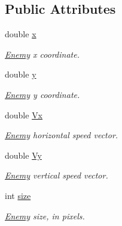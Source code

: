 \subsection*{Public Attributes}
\begin{DoxyCompactItemize}
\item 
\mbox{\label{class_enemy_a05e9e91e87d6eae0da31cc6d78a0b43d}} 
double \hyperlink{class_enemy_a05e9e91e87d6eae0da31cc6d78a0b43d}{x}
\begin{DoxyCompactList}\small\item\em \hyperlink{class_enemy}{Enemy} x coordinate. \end{DoxyCompactList}\item 
\mbox{\label{class_enemy_a23d38ed46475359ad6a4e06d4dd49131}} 
double \hyperlink{class_enemy_a23d38ed46475359ad6a4e06d4dd49131}{y}
\begin{DoxyCompactList}\small\item\em \hyperlink{class_enemy}{Enemy} y coordinate. \end{DoxyCompactList}\item 
\mbox{\label{class_enemy_af615681d1038587714a8552823e303d0}} 
double \hyperlink{class_enemy_af615681d1038587714a8552823e303d0}{Vx}
\begin{DoxyCompactList}\small\item\em \hyperlink{class_enemy}{Enemy} horizontal speed vector. \end{DoxyCompactList}\item 
\mbox{\label{class_enemy_a60b9d71f1d711cb2d79787e4cce46046}} 
double \hyperlink{class_enemy_a60b9d71f1d711cb2d79787e4cce46046}{Vy}
\begin{DoxyCompactList}\small\item\em \hyperlink{class_enemy}{Enemy} vertical speed vector. \end{DoxyCompactList}\item 
int \hyperlink{class_enemy_aa8e17bc99723176548d71447e54cac73}{size}
\begin{DoxyCompactList}\small\item\em \hyperlink{class_enemy}{Enemy} size, in pixels. \end{DoxyCompactList}\item 
\mbox{\label{class_enemy_a0be1b3814551bf2d43cbcd00a2c8134e}} 

\end{DoxyCompactItemize}
